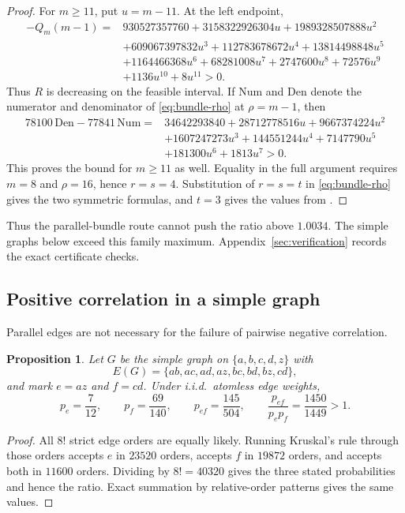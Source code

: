 \documentclass[10pt,a4paper]{amsart}
\newtheorem{proposition}[theorem]{Proposition}
\begin{document}
\begin{proof}
For $m\ge11$, put $u=m-11$. At the left endpoint,
\begin{align*}
-Q_m(m-1)={}&930527357760+3158322926304u+1989328507888u^2\\
&+609067397832u^3+112783678672u^4+13814498848u^5\\
&+1164466368u^6+68281008u^7+2747600u^8+72576u^9\\
&+1136u^{10}+8u^{11}>0.
\end{align*}
Thus $R$ is decreasing on the feasible interval. If $\mathrm{Num}$ and
$\mathrm{Den}$ denote the numerator and denominator of
\eqref{eq:bundle-rho} at $\rho=m-1$, then
\begin{align*}
78100\,\mathrm{Den}-77841\,\mathrm{Num}
={}&34642293840+28712778516u+9667374224u^2\\
&+1607247273u^3+144551244u^4+7147790u^5\\
&+181300u^6+1813u^7>0.
\end{align*}
This proves the bound for $m\ge11$ as well. Equality in the full argument
requires $m=8$ and $\rho=16$, hence $r=s=4$. Substitution of $r=s=t$ in
\eqref{eq:bundle-rho} gives the two symmetric formulas, and $t=3$ gives the
values from \cite{LPS}.
\end{proof}

Thus the parallel-bundle route cannot push the ratio above $1.0034$. The simple
graphs below exceed this family maximum. Appendix~\ref{sec:verification}
records the exact certificate checks.

\subsection{Positive correlation in a simple graph}

Parallel edges are not necessary for the failure of pairwise negative
correlation.

\begin{proposition}
\label{prop:simple-counterexample}
Let $G$ be the simple graph on $\{a,b,c,d,z\}$ with
\[
E(G)=\{ab,ac,ad,az,bc,bd,bz,cd\},
\]
and mark $e=az$ and $f=cd$. Under i.i.d.\ atomless edge weights,
\[
p_e=\frac7{12},\qquad p_f=\frac{69}{140},\qquad
p_{ef}=\frac{145}{504},\qquad
\frac{p_{ef}}{p_ep_f}=\frac{1450}{1449}>1.
\]
\end{proposition}

\begin{proof}
All $8!$ strict edge orders are equally likely. Running Kruskal's rule through
those orders accepts $e$ in $23520$ orders, accepts $f$ in $19872$ orders, and
accepts both in $11600$ orders. Dividing by $8!=40320$ gives the three stated
probabilities and hence the ratio. Exact summation by relative-order patterns
gives the same values.
\end{proof}
\end{document}
